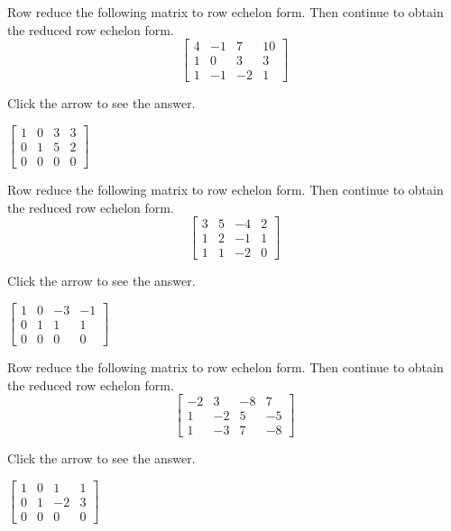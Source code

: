 \documentclass{ximera}
\begin{document}
\begin{problem}\label{prb:2.22} Row reduce the following matrix to row echelon form. Then continue to obtain the reduced row echelon form.
\begin{equation*}
\left[
\begin{array}{rrrr}
4 & -1 & 7 & 10 \\
1 & 0 & 3 & 3 \\
1 & -1 & -2 & 1
\end{array}
\right]
\end{equation*}

Click the arrow to see the answer. 
\begin{expandable}
$\begin{bmatrix}1 & 0&3&3\\0&1&5&2\\0&0&0&0\end{bmatrix}$
\end{expandable}
\end{problem}

\begin{problem}\label{prb:2.23} Row reduce the following matrix to row echelon form. Then continue to obtain the reduced row echelon form.
\begin{equation*}
\left[
\begin{array}{rrrr}
3 & 5 & -4 & 2 \\
1 & 2 & -1 & 1 \\
1 & 1 & -2 & 0
\end{array}
\right]
\end{equation*}

Click the arrow to see the answer. 
\begin{expandable}
$\begin{bmatrix}1 & 0&-3&-1\\0&1&1&1\\0&0&0&0\end{bmatrix}$
\end{expandable}
\end{problem}

\begin{problem}\label{prb:2.24} Row reduce the following matrix to row echelon form. Then continue to obtain the reduced row echelon form.
\begin{equation*}
\left[
\begin{array}{rrrr}
-2 & 3 & -8 & 7 \\
1 & -2 & 5 & -5 \\
1 & -3 & 7 & -8
\end{array}
\right]
\end{equation*}

Click the arrow to see the answer. 
\begin{expandable}
$\begin{bmatrix}1 & 0&1&1\\0&1&-2&3\\0&0&0&0\end{bmatrix}$
\end{expandable}
\end{problem}
\end{document}
